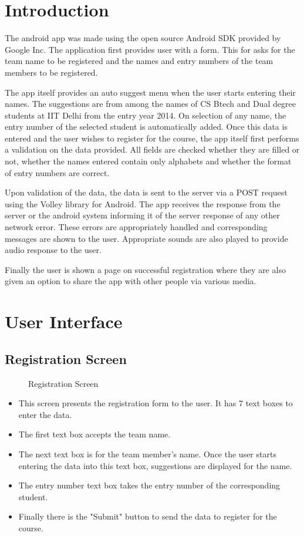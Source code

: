 \documentclass[12pt]{article}
\begin{document}
\section{Introduction}
The android app was made using the open source Android SDK provided by Google Inc. The application first provides user with a form. This for asks for the team name to be registered and the names and entry numbers of the team members to be registered.
\par
The app itself provides an auto suggest menu when the user starts entering their names. The suggestions are from among the names of CS Btech and Dual degree students at IIT Delhi from the entry year 2014. On selection of any name, the entry number of the selected student is automatically added. Once this data is entered and the user wishes to register for the course, the app itself first performs a validation on the data provided. All fields are checked whether they are filled or not, whether the names entered contain only alphabets and whether the format of entry numbers are correct.
\par
Upon validation of the data, the data is sent to the server via a POST request using the Volley library for Android. The app receives the response from the server or the android system informing it of the server response of any other network error. These errors are appropriately handled and corresponding messages are shown to the user. Appropriate sounds are also played to provide audio response to the user.
\par
Finally the user is shown a page on successful registration where they are also given an option to share the app with other people via various media.

\section{User Interface}
\subsection{Registration Screen}

\begin{figure}[!ht]
	\centering
	\caption{Registration Screen}
\end{figure}



\begin{itemize}
\setlength\itemsep{-0.4em}
\item This screen presents the registration form to the user. It has 7 text boxes to enter the data.
\item The first text box accepts the team name.
\item The next text box is for the team member's name. Once the user starts entering the data into this text box, suggestions are displayed for the name.
\item The entry number text box takes the entry number of the corresponding student.
\item Finally there is the "Submit" button to send the data to register for the course.
\end{itemize}
\end{document}

